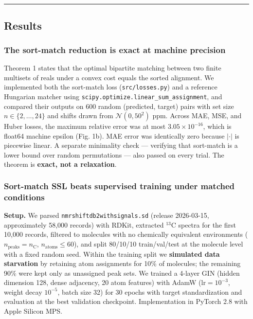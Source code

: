 \documentclass[
]{article}
\begin{document}
\begin{center}\rule{0.5\linewidth}{0.5pt}\end{center}

\subsection{Results}\label{results}

\subsubsection{The sort-match reduction is exact at machine
precision}\label{the-sort-match-reduction-is-exact-at-machine-precision}

Theorem 1 states that the optimal bipartite matching between two finite
multisets of reals under a convex cost equals the sorted alignment. We
implemented both the sort-match loss (\texttt{src/losses.py}) and a
reference Hungarian matcher using
\texttt{scipy.optimize.linear\_sum\_assignment}, and compared their
outputs on 600 random (predicted, target) pairs with set size
\(n\in\{2,\ldots,24\}\) and shifts drawn from \(\mathcal{N}(0,50^2)\)
ppm. Across MAE, MSE, and Huber losses, the maximum relative error was
at most \(3.05\times 10^{-16}\), which is float64 machine epsilon (Fig.
1b). MAE error was identically zero because \(|\cdot|\) is piecewise
linear. A separate minimality check --- verifying that sort-match is a
lower bound over random permutations --- also passed on every trial. The
theorem is \textbf{exact, not a relaxation}.

\subsubsection{Sort-match SSL beats supervised training under matched
conditions}\label{sort-match-ssl-beats-supervised-training-under-matched-conditions}

\textbf{Setup.} We parsed \texttt{nmrshiftdb2withsignals.sd} (release
2026-03-15, approximately 58,000 records) with RDKit, extracted
\(^{13}\)C spectra for the first 10,000 records, filtered to molecules
with no chemically equivalent environments
(\(n_{\text{peaks}}=n_{\text{C}}\), \(n_{\text{atoms}}\leq 60\)), and
split 80/10/10 train/val/test at the molecule level with a fixed random
seed. Within the training split we \textbf{simulated data starvation} by
retaining atom assignments for 10\% of molecules; the remaining 90\%
were kept only as unassigned peak sets. We trained a 4-layer GIN (hidden
dimension 128, dense adjacency, 20 atom features) with AdamW
(\(\text{lr}=10^{-3}\), weight decay \(10^{-5}\), batch size 32) for 30
epochs with target standardization and evaluation at the best validation
checkpoint. Implementation in PyTorch 2.8 with Apple Silicon MPS.
\end{document}
